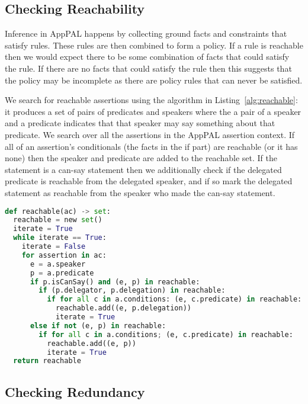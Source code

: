 \documentclass[a4paper]{article}
\begin{document}
\subsection{Checking Reachability}

Inference in AppPAL happens by collecting ground facts and constraints that satisfy rules.
These rules are then combined to form a policy. 
If a rule is reachable then we would expect there to be some combination of facts that could satisfy the rule.
If there are no facts that could satisfy the rule then this suggests that the policy may be incomplete as there are policy rules that can never be satisfied.  

We search for reachable assertions using the algorithm in Listing~\ref{alg:reachable}:
it produces a set of pairs of predicates and speakers where the a pair of a speaker and a predicate indicates that that speaker may say something about that predicate.
We search over all the assertions in the AppPAL assertion context.
If all of an assertion's conditionals (the facts in the if part) are reachable (or it has none) then the speaker and predicate are added to the reachable set.
If the statement is a can-say statement then we additionally check if the delegated predicate is reachable from the delegated speaker, and if so mark the delegated statement as reachable from the speaker who made the can-say statement.

\begin{lstlisting}[language=Python,float,caption={Procedure for finding all reachable assertions.},label={alg:reachable}]
def reachable(ac) -> set:
  reachable = new set()
  iterate = True
  while iterate == True:
    iterate = False
    for assertion in ac:
      e = a.speaker
      p = a.predicate
      if p.isCanSay() and (e, p) in reachable:
        if (p.delegator, p.delegation) in reachable:
          if for all c in a.conditions: (e, c.predicate) in reachable:
            reachable.add((e, p.delegation))
            iterate = True
      else if not (e, p) in reachable:
        if for all c in a.conditions; (e, c.predicate) in reachable:
          reachable.add((e, p))
          iterate = True
  return reachable
\end{lstlisting}

\subsection{Checking Redundancy}
\end{document}

